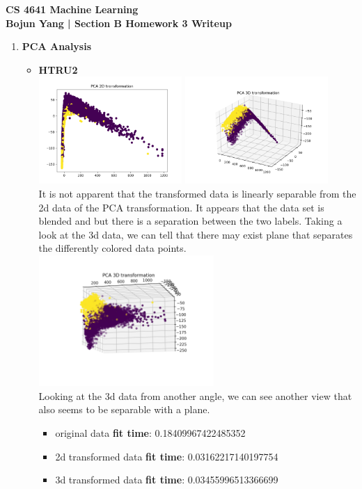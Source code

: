 \documentclass[12pt]{article}
\begin{document}
\begin{center}
    \textbf{CS 4641 Machine Learning \\ Bojun Yang | Section B Homework 3 Writeup}
\end{center}

\begin{enumerate}[leftmargin=\parindent,align=left,labelwidth=\parindent,noitemsep]
\item \textbf{PCA Analysis}
\begin{itemize}[topsep=10pt]
    \item \textbf{HTRU2} \\
    \includegraphics[width=0.45\textwidth]{pca_HTRU2_2d} \includegraphics[width=0.45\textwidth]{pca_HTRU2_3d} \\
    It is not apparent that the transformed data is linearly separable from the 2d data of the PCA transformation. It appears that the data set is blended and but there is a separation between the two labels. Taking a look at the 3d data, we can tell that there may exist plane that separates the differently colored data points. \\
    \includegraphics[width=0.55\textwidth]{pca_HTRU2_3d1} \\
    Looking at the 3d data from another angle, we can see another view that also seems to be separable with a plane.
    \begin{itemize}
        \item original data \textbf{fit time}: 0.18409967422485352
        \item 2d transformed data \textbf{fit time}: 0.03162217140197754
        \item 3d transformed data \textbf{fit time}: 0.03455996513366699 \\


\end{itemize}
\end{itemize}
\end{enumerate}
\end{document}
